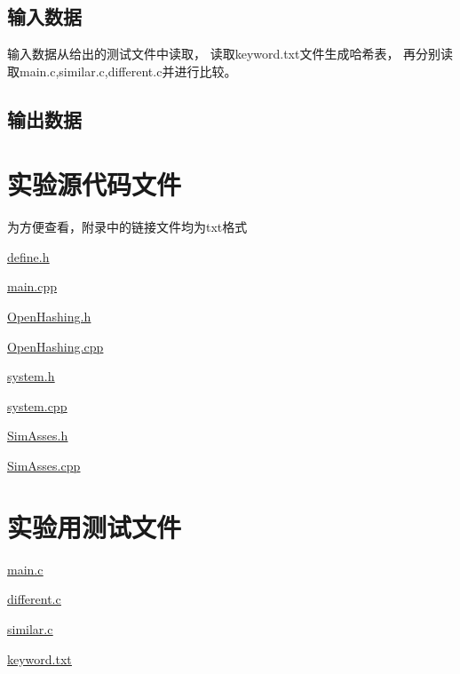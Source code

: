\documentclass[a4paper]{article}
\begin{document}
    \subsection{输入数据}\label{subsec:in}
    {{输入数据从给出的测试文件中读取，
    读取keyword.txt文件生成哈希表，
    再分别读取main.c,similar.c,different.c并进行比较。}}

    \subsection{输出数据}\label{subsec:out}







    \noindent{ }



    \noindent{ }




    \appendix


    \section{实验源代码文件}\label{sec:appendix1}
    {{为方便查看，附录中的链接文件均为txt格式}}

    \href{../exp6/define.h.txt}{\underline{define.h}}

    \href{../exp6/main.cpp.txt}{\underline{main.cpp}}

    \href{../exp6/OpenHashing.h.txt}{\underline{OpenHashing.h}}

    \href{../exp6/OpenHashing.cpp.txt}{\underline{OpenHashing.cpp}}

    \href{../exp6/system.h.txt}{\underline{system.h}}

    \href{../exp6/system.cpp.txt}{\underline{system.cpp}}

    \href{../exp6/SimAsses.h.txt}{\underline{SimAsses.h}}

    \href{../exp6/SimAsses.cpp.txt}{\underline{SimAsses.cpp}}


    \section{实验用测试文件}\label{sec:appendix2}
    \href{../exp6/file/main.c.txt}{\underline{main.c}}

    \href{../exp6/file/different.c.txt}{\underline{different.c}}

    \href{../exp6/file/similar.c.txt}{\underline{similar.c}}

    \href{../exp6/file/keyword.txt}{\underline{keyword.txt}}
\end{document}
